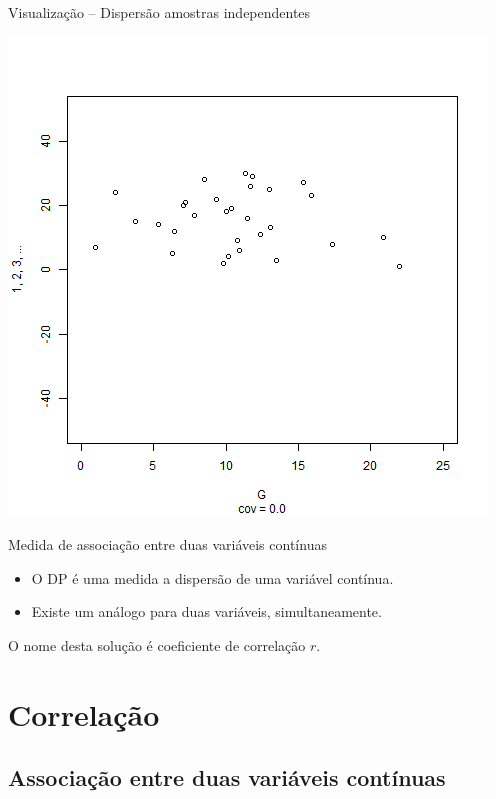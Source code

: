 \documentclass{beamer}
\begin{document}
\begin{frame}{\scriptsize Visualização -- Dispersão amostras independentes}
  \begin{center}
    \includegraphics[height=.8\textheight]{Cap17/anim-n}
  \end{center}
\end{frame}

\begin{frame}{\scriptsize Medida de associação entre duas variáveis contínuas}
  \begin{itemize}
    \footnotesize
  \item O DP é uma medida a dispersão de uma variável contínua.
    \bigskip
  \item Existe um análogo para duas variáveis, simultaneamente.
  \end{itemize}

  \vfill
  \begin{block}{}
    \footnotesize
    O nome desta solução é \alert{coeficiente de correlação} $r$.
  \end{block}
\end{frame}

\section{Correlação}

\subsection[Associação]{Associação entre duas variáveis contínuas}
\end{document}
